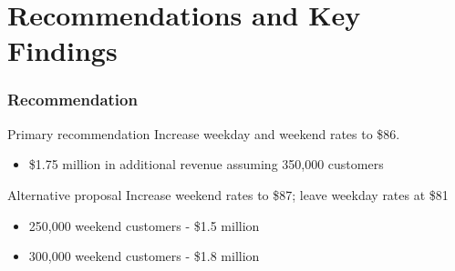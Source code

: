 \documentclass{beamer}
\begin{document}
\section{Recommendations and Key Findings} %
\begin{frame}
\frametitle{Recommendation}
\begin{block}{Primary recommendation}
Increase weekday and weekend rates to \$86.
\begin{itemize}
\item \$1.75 million in additional revenue assuming 350,000 customers
\end{itemize}
\end{block}
\begin{block}{Alternative proposal}
Increase weekend rates to \$87; leave weekday rates at \$81
\begin{itemize}
\item 250,000 weekend customers - \$1.5 million
\item 300,000 weekend customers - \$1.8 million
\end{itemize}
\end{block}
\end{frame}

\end{document}
